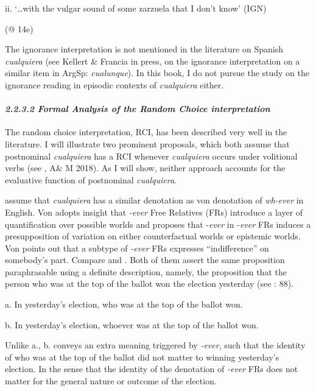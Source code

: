   ii.  ‘…with the vulgar sound of some zarzuela that I don’t know’ (IGN)

  (@ 14e)

The ignorance interpretation is not mentioned in the literature on Spanish \textit{cualquiera} (see Kellert \& Francia in press, on the ignorance interpretation on a similar item in ArgSp: \textit{cualunque}). In this book, I do not pursue the study on the ignorance reading in episodic contexts of \textit{cualquiera} either. 

\paragraph{\textit{2.2.3.2 Formal Analysis of the Random Choice interpretation}}

The random choice interpretation, RCI, has been described very well in the literature. I will illustrate two prominent proposals, which both assume that postnominal \textit{cualquiera} has a RCI whenever \textit{cualquiera} occurs under volitional verbs (see \citealt{ChoiRomero2008}, A\& M 2018). As I will show, neither approach accounts for the evaluative function of postnominal \textit{cualquiera}.

\citet{ChoiRomero2008} assume that \textit{cualquiera} has a similar denotation as von  denotation of \textit{wh-ever} in English. Von \citet{Fintel2000} adopts  insight that \textit{\nobreakdash-ever} Free Relatives (FRs) introduce a layer of quantification over possible worlds and proposes that \nobreakdash-\textit{ever} in \nobreakdash-\textit{ever} FRs induces a presupposition of variation on either counterfactual worlds or epistemic worlds. Von \citet{Fintel2000} points out that a subtype of \textit{\nobreakdash-ever} FRs expresses “indifference” on somebody’s part. Compare  and . Both of them assert the same proposition paraphrasable using a definite description, namely, the proposition that the person who was at the top of the ballot won the election yesterday (see \citealt{ChoiRomero2008}: 88).

\label{bkm:Ref533762240}  a.  In yesterday’s election, who was at the top of the ballot won.

  b.  In yesterday’s election, whoever was at the top of the ballot won.

Unlike a., b. conveys an extra meaning triggered by \textit{\nobreakdash-ever}, such that the identity of who was at the top of the ballot did not matter to winning yesterday’s election. In the sense that the identity of the denotation of \textit{\nobreakdash-ever} FRs does not matter for the general nature or outcome of the election.

